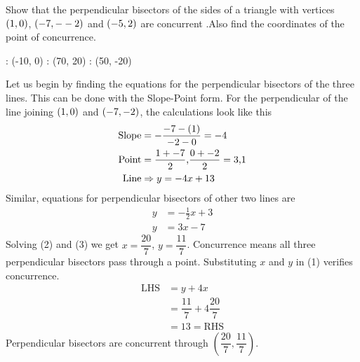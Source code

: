 \question Show that the perpendicular bisectors of the sides of a triangle with vertices $(1 , 0 )$, $(-7 , --2)$ and $(-5 , 2 )$ are concurrent .Also find the coordinates of the point of concurrence.

\insertQR{}

\watchout

\ifprintanswers
  \begin{marginfigure}
      : (-10, 0)
      : (70, 20)
      : (50, -20)
    \figdrawbegin{}
      \figdrawline [10, 20]
      \figdrawline [20, 30]
      \figdrawline [30, 10]
    \figdrawend
    \centerline{\box\figBoxA}
  \end{marginfigure}
\fi 

\begin{solution}
  Let us begin by finding the equations for the perpendicular bisectors 
  of the three lines. This can be done with the Slope-Point form.
  For the perpendicular of the line joining $(1, 0)$ and 
  $(-7, -2)$, the calculations look like this  
  \begin{align}
	\text{Slope} &= -\dfrac{-7 - (1)}
	    				   {-2 - 0} = -4  	   \nonumber \\
    \text{Point} &= \dfrac{1+-7}{2}\text{,}
    				\dfrac{0+-2}{2} = 3\text{,}1 \nonumber \\ 
    \text{Line}  &\Rightarrow y = -4x + 13
  \end{align}
  Similar, equations for perpendicular bisectors of other two lines are
  \begin{align}
  	y &= -\frac{1}{2}x + 3 \\
  	y &= 3x - 7
  \end{align}
  Solving (2) and (3) we get $x=\dfrac{20}{7}$, $y=\dfrac{11}{7}$.
  Concurrence means all three perpendicular bisectors pass through a point.
  Substituting $x$ and $y$ in (1) verifies concurrence.
  \begin{align}
  	\text{LHS} &= y + 4x \nonumber \\
  			   &= \dfrac{11}{7} + 4\dfrac{20}{7} \nonumber \\
  			   &= 13 = \text{RHS} \nonumber
  \end{align}
  Perpendicular bisectors are concurrent through 
  $(\dfrac{20}{7}, \dfrac{11}{7})$.
\end{solution}

